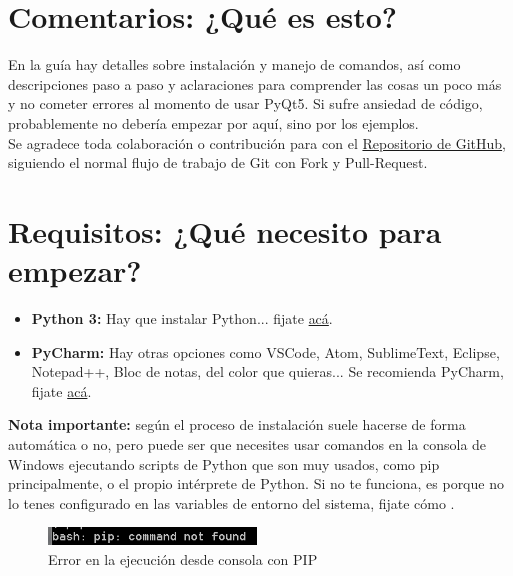 \section{Comentarios: ¿Qu\'e es esto?}
En la gu\'ia hay detalles sobre instalaci\'on y manejo de comandos, as\'i como descripciones paso a paso y aclaraciones para comprender
las cosas un poco m\'as y no cometer errores al momento de usar PyQt5. Si sufre ansiedad de c\'odigo, probablemente no deber\'ia empezar por aqu\'i, sino por los ejemplos.
\\
Se agradece toda colaboraci\'on o contribuci\'on para con el \href{https://github.com/nicotrozzo/pyqt5-tutorials}{Repositorio de GitHub}, siguiendo el normal flujo de trabajo de Git con Fork y Pull-Request.

\section{Requisitos: ¿Qu\'e necesito para empezar?}

\begin{itemize}
    \item \textbf{Python 3:} Hay que instalar Python... fijate \href{https://www.python.org/}{ac\'a}.
    \item \textbf{PyCharm:} Hay otras opciones como VSCode, Atom, SublimeText, Eclipse, Notepad++, Bloc de notas, del color que quieras... Se recomienda PyCharm, fijate \href{https://www.jetbrains.com/pycharm/}{ac\'a}.
\end{itemize}

\textbf{Nota importante:} seg\'un el proceso de instalaci\'on suele hacerse de forma autom\'atica o no, pero puede ser que necesites usar comandos en la consola de Windows ejecutando scripts de Python que son muy usados,
como pip principalmente, o el propio int\'erprete de Python. Si no te funciona, es porque no lo tenes configurado en las variables de entorno del sistema, fijate c\'omo .

\begin{figure}[H]
    \centering
    \includegraphics[scale=1]{imagenes/cmd/cmd_error.PNG}
    \caption{Error en la ejecuci\'on desde consola con PIP}
\end{figure}


